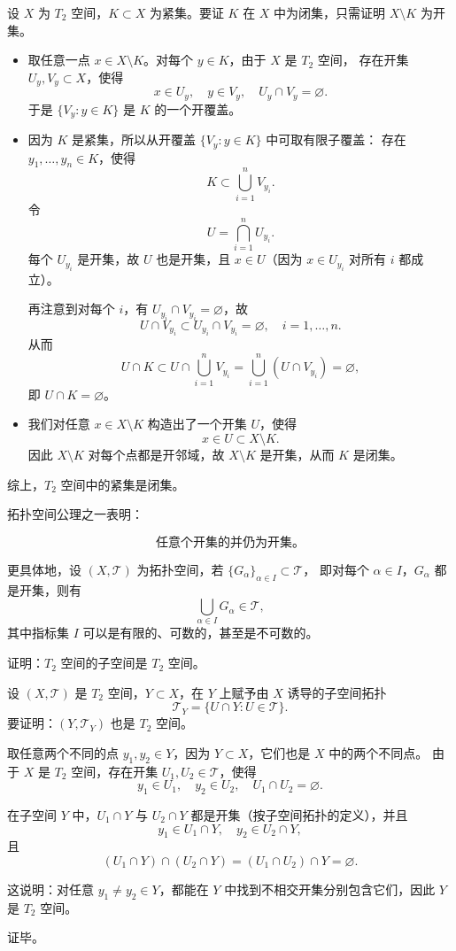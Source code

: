 \begin{solution}
设 $X$ 为 $T_2$ 空间，$K\subset X$ 为紧集。要证 $K$ 在 $X$ 中为闭集，只需证明 $X\setminus K$ 为开集。

\begin{itemize}
  \item[(1)] 取任意一点 $x\in X\setminus K$。对每个 $y\in K$，由于 $X$ 是 $T_2$ 空间，
  存在开集 $U_y,V_y\subset X$，使得
  \[
  x\in U_y,\quad y\in V_y,\quad U_y\cap V_y=\varnothing.
  \]
  于是 $\{V_y:y\in K\}$ 是 $K$ 的一个开覆盖。

  \item[(2)] 因为 $K$ 是紧集，所以从开覆盖 $\{V_y:y\in K\}$ 中可取有限子覆盖：
  存在 $y_1,\dots,y_n\in K$，使得
  \[
  K\subset \bigcup_{i=1}^n V_{y_i}.
  \]
  令
  \[
  U=\bigcap_{i=1}^n U_{y_i}.
  \]
  每个 $U_{y_i}$ 是开集，故 $U$ 也是开集，且 $x\in U$（因为 $x\in U_{y_i}$ 对所有 $i$ 都成立）。

  再注意到对每个 $i$，有 $U_{y_i}\cap V_{y_i}=\varnothing$，故
  \[
  U\cap V_{y_i}\subset U_{y_i}\cap V_{y_i}=\varnothing,\quad i=1,\dots,n.
  \]
  从而
  \[
  U\cap K
  \subset U\cap \bigcup_{i=1}^n V_{y_i}
  = \bigcup_{i=1}^n (U\cap V_{y_i})
  = \varnothing,
  \]
  即 $U\cap K=\varnothing$。

  \item[(3)] 我们对任意 $x\in X\setminus K$ 构造出了一个开集 $U$，使得
  \[
  x\in U\subset X\setminus K.
  \]
  因此 $X\setminus K$ 对每个点都是开邻域，故 $X\setminus K$ 是开集，从而 $K$ 是闭集。
\end{itemize}

综上，$T_2$ 空间中的紧集是闭集。
\end{solution}
\begin{dxtips}
    拓扑空间公理之一表明：

\[
\text{任意个开集的并仍为开集。}
\]

更具体地，设 $(X,\mathcal{T})$ 为拓扑空间，若 $\{G_\alpha\}_{\alpha\in I}\subset\mathcal{T}$，
即对每个 $\alpha\in I$，$G_\alpha$ 都是开集，则有
\[
\bigcup_{\alpha\in I} G_\alpha \in \mathcal{T},
\]
其中指标集 $I$ 可以是有限的、可数的，甚至是不可数的。
\end{dxtips}
\begin{homework}[6]
证明：$T_2$ 空间的子空间是 $T_2$ 空间。
\end{homework}
\begin{solution}
设 $(X,\mathcal{T})$ 是 $T_2$ 空间，$Y\subset X$，在 $Y$ 上赋予由 $X$ 诱导的子空间拓扑
\[
\mathcal{T}_Y=\{U\cap Y:U\in\mathcal{T}\}.
\]
要证明：$(Y,\mathcal{T}_Y)$ 也是 $T_2$ 空间。

取任意两个不同的点 $y_1,y_2\in Y$，因为 $Y\subset X$，它们也是 $X$ 中的两个不同点。
由于 $X$ 是 $T_2$ 空间，存在开集 $U_1,U_2\in\mathcal{T}$，使得
\[
y_1\in U_1,\quad y_2\in U_2,\quad U_1\cap U_2=\varnothing.
\]

在子空间 $Y$ 中，$U_1\cap Y$ 与 $U_2\cap Y$ 都是开集（按子空间拓扑的定义），并且
\[
y_1\in U_1\cap Y,\quad y_2\in U_2\cap Y,
\]
且
\[
(U_1\cap Y)\cap(U_2\cap Y)
= (U_1\cap U_2)\cap Y
= \varnothing.
\]

这说明：对任意 $y_1\ne y_2\in Y$，都能在 $Y$ 中找到不相交开集分别包含它们，因此 $Y$ 是 $T_2$ 空间。

证毕。
\end{solution}
